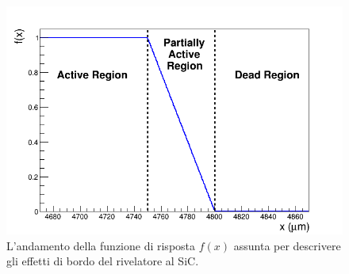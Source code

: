 \begin{figure} [!p]
	\centering
	\includegraphics[width=\textwidth, keepaspectratio]{Grafici_Tesi/Funzione/funzione.png}
	\caption{L'andamento della funzione di risposta $f(x)$ assunta per descrivere gli effetti di bordo del rivelatore al SiC.} \label{fig:funzione_risposta}
\end{figure}

